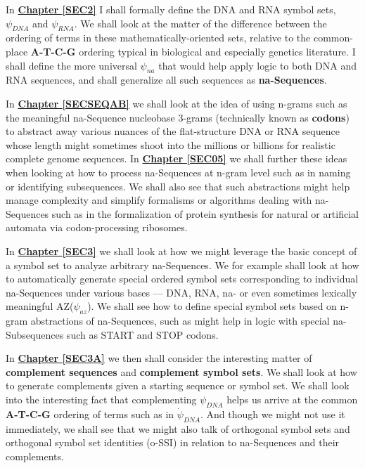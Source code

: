 \documentclass[a4paper, 18pt]{book} %
\begin{document}
In \textbf{\hyperref[SEC2]{Chapter \ref{SEC2}}} I shall formally define the DNA and RNA symbol sets, $\psi_{DNA}$ and $\psi_{RNA}$. We shall look at the matter of the difference between the ordering of terms in these mathematically-oriented sets, relative to the common-place \textbf{A-T-C-G} ordering typical in biological and especially genetics literature. I shall define the more universal $\psi_{na}$ that would help apply logic to both DNA and RNA sequences, and shall generalize all such sequences as \textbf{na-Sequences}.

In \textbf{\hyperref[SECSEQAB]{Chapter \ref{SECSEQAB}}} we shall look at the idea of using n-grams such as the meaningful na-Sequence nucleobase 3-grams (technically known as \textbf{codons}) to abstract away various nuances of the flat-structure DNA or RNA sequence whose length might sometimes shoot into the millions or billions for realistic complete genome sequences. In \textbf{\hyperref[SEC05]{Chapter \ref{SEC05}}} we shall further these ideas when looking at how to process na-Sequences at n-gram level such as in naming or identifying subsequences. We shall also see that such abstractions might help manage complexity and simplify formalisms or algorithms dealing with na-Sequences such as in the formalization of protein synthesis for natural or artificial automata via codon-processing ribosomes.


In \textbf{\hyperref[SEC3]{Chapter \ref{SEC3}}} we shall look at how we might leverage the basic concept of a symbol set to analyze arbitrary na-Sequences. We for example shall look at how to automatically generate special ordered symbol sets corresponding to individual na-Sequences under various bases --- DNA, RNA, na- or even sometimes lexically meaningful AZ($\psi_{az}$). We shall see how to define special symbol sets based on n-gram abstractions of na-Sequences, such as might help in logic with special na-Subsequences such as START and STOP codons.


In \textbf{\hyperref[SEC3A]{Chapter \ref{SEC3A}}} we then shall consider the interesting matter of \textbf{complement sequences} and \textbf{complement symbol sets}. We shall look at how to generate complements given a starting sequence or symbol set. We shall look into the interesting fact that complementing $\psi_{DNA}$ helps us arrive at the common \textbf{A-T-C-G} ordering of terms such as in $\dot{\psi}_{DNA}$. And though we might not use it immediately, we shall see that we might also talk of orthogonal symbol sets and orthogonal symbol set identities (o-SSI\cite{ossipaper}) in relation to na-Sequences and their complements.
\end{document}

